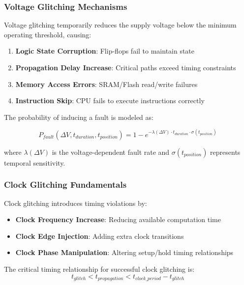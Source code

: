\documentclass[12pt,a4paper]{article}
\begin{document}
\subsubsection{Voltage Glitching Mechanisms}

Voltage glitching temporarily reduces the supply voltage below the minimum operating threshold, causing:

\begin{enumerate}
    \item \textbf{Logic State Corruption}: Flip-flops fail to maintain state
    \item \textbf{Propagation Delay Increase}: Critical paths exceed timing constraints  
    \item \textbf{Memory Access Errors}: SRAM/Flash read/write failures
    \item \textbf{Instruction Skip}: CPU fails to execute instructions correctly
\end{enumerate}

The probability of inducing a fault is modeled as:

\begin{equation}
P_{fault}(\Delta V, t_{duration}, t_{position}) = 1 - e^{-\lambda(\Delta V) \cdot t_{duration} \cdot \sigma(t_{position})}
\end{equation}

where $\lambda(\Delta V)$ is the voltage-dependent fault rate and $\sigma(t_{position})$ represents temporal sensitivity.

\subsubsection{Clock Glitching Fundamentals}

Clock glitching introduces timing violations by:
\begin{itemize}
    \item \textbf{Clock Frequency Increase}: Reducing available computation time
    \item \textbf{Clock Edge Injection}: Adding extra clock transitions
    \item \textbf{Clock Phase Manipulation}: Altering setup/hold timing relationships
\end{itemize}

The critical timing relationship for successful clock glitching is:
\begin{equation}
t_{glitch} < t_{propagation} < t_{clock\_period} - t_{glitch}
\end{equation}
\end{document}
